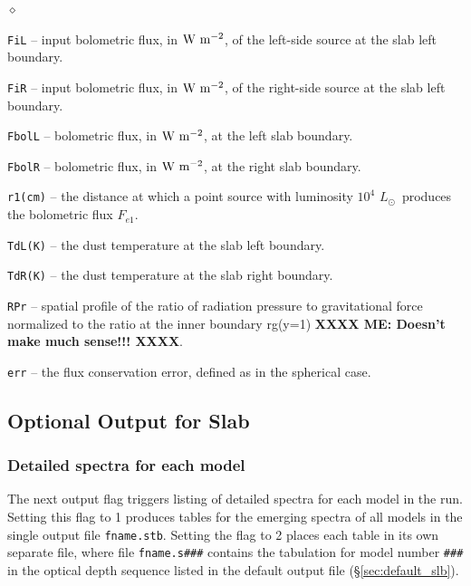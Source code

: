 \documentclass[11pt]{article}
\def\E#1{\hbox{$10^{#1}$}}
\def\Lo     {\hbox{$L_{\odot}$}}
\begin{document}
\begin{list}{$\diamond$}{}
\item{\tt FiL} -- input bolometric flux, in $\rm W\ m^{-2}$, of the
  left-side source at the slab left boundary.
\item{\tt FiR} -- input bolometric flux, in $\rm W\ m^{-2}$, of the
  right-side source at the slab left boundary.
\item{\tt FbolL} -- bolometric flux, in $\rm W\ m^{-2}$, at the left
  slab boundary.
\item{\tt FbolR} -- bolometric flux, in $\rm W\ m^{-2}$, at the right
  slab boundary.
\item{\tt r1(cm)} -- the distance at which a point source with
  luminosity \E4 \Lo\ produces the bolometric flux $F_{e1}$.
\item {\tt TdL(K)} -- the dust temperature at the slab left boundary.
\item {\tt TdR(K)} -- the dust temperature at the slab right boundary.
\item{\tt RPr} -- spatial profile of the ratio of radiation pressure to
  gravitational force normalized to the ratio at the inner boundary
  rg(y=1) \textbf{XXXX ME: Doesn't make much sense!!! XXXX}.
\item{\tt err} -- the flux conservation error, defined as in the
  spherical case.

\end{list}

\subsection{Optional Output for Slab}
\label{sec:optional_slb}

\subsubsection{Detailed spectra for each model }
\label{sec:detail_slb}

The next output flag triggers listing of detailed spectra for each model in
the run.  Setting this flag to 1 produces tables for the emerging spectra of
all models in the single output file {\tt fname.stb}.  Setting the flag to 2
places each table in its own separate file, where file {\tt fname.s\#\#\#}
contains the tabulation for model number {\tt \#\#\#} in the optical depth
sequence listed in the default output file (\S\ref{sec:default_slb}).
\end{document}
